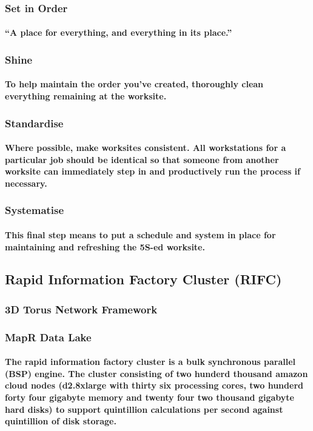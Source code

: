 \documentclass{acm_proc_article-sp}
\begin{document}
\subsubsection{Set in Order}
\paragraph{“A place for everything, and everything in its place.” }
\subsubsection{Shine}
\paragraph{To help maintain the order you’ve created, thoroughly clean everything remaining at the worksite.}
\subsubsection{Standardise}
\paragraph{Where possible, make worksites consistent. All workstations for a particular job should be identical so that someone from another worksite can immediately step in and productively run the process if necessary.}
\subsubsection{Systematise}
\paragraph{This final step means to put a schedule and system in place for maintaining and refreshing the 5S-ed worksite.}
\pagebreak
\subsection{Rapid Information Factory Cluster (RIFC)}
\subsubsection{3D Torus Network Framework}
\subsubsection{MapR Data Lake}
\paragraph{The rapid information factory cluster is a bulk synchronous parallel (BSP) engine. The cluster consisting of two hunderd thousand amazon cloud nodes (d2.8xlarge with thirty six processing cores, two hunderd forty four gigabyte memory and twenty four two thousand gigabyte hard disks) to support quintillion calculations per second against quintillion of disk storage.}
\end{document}
